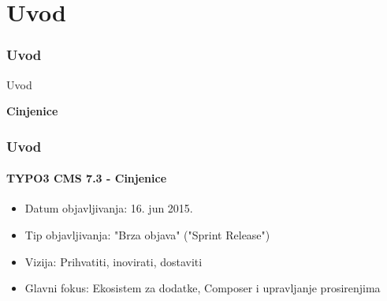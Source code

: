 %

\section{Uvod}
\begin{frame}[fragile]
	\frametitle{Uvod}

	\begin{center}\huge{Uvod}\end{center}
	\begin{center}\huge{\color{typo3darkgrey}\textbf{Cinjenice}}\end{center}

\end{frame}

\begin{frame}[fragile]
	\frametitle{Uvod}
	\framesubtitle{TYPO3 CMS 7.3 - Cinjenice}

	\begin{itemize}
		\item Datum objavljivanja: 16. jun 2015.
		\item Tip objavljivanja: "Brza objava" ("Sprint Release")
		\item Vizija: Prihvatiti, inovirati, dostaviti
		\item Glavni fokus: Ekosistem za dodatke, Composer i upravljanje prosirenjima
	\end{itemize}

\end{frame}

